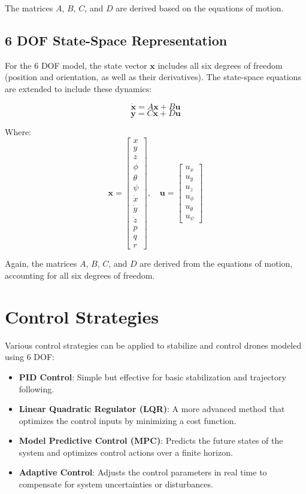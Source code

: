 \documentclass[a4paper,12pt]{report}
\begin{document}
The matrices \(A\), \(B\), \(C\), and \(D\) are derived based on the equations of motion.

\section{6 DOF State-Space Representation}
For the 6 DOF model, the state vector \(\mathbf{x}\) includes all six degrees of freedom (position and orientation, as well as their derivatives). The state-space equations are extended to include these dynamics:

\[
    \dot{\mathbf{x}} = A\mathbf{x} + B\mathbf{u}
\]
\[
    \mathbf{y} = C\mathbf{x} + D\mathbf{u}
\]

Where:
\[
    \mathbf{x} = \begin{bmatrix} x \\ y \\ z \\ \phi \\ \theta \\ \psi \\ \dot{x} \\ \dot{y} \\ \dot{z} \\ p \\ q \\ r \end{bmatrix}, \quad \mathbf{u} = \begin{bmatrix} u_x \\ u_y \\ u_z \\ u_\phi \\ u_\theta \\ u_\psi \end{bmatrix}
\]

Again, the matrices \(A\), \(B\), \(C\), and \(D\) are derived from the equations of motion, accounting for all six degrees of freedom.

\chapter{Control Strategies}

Various control strategies can be applied to stabilize and control drones modeled using 6 DOF:

\begin{itemize}
    \item \textbf{PID Control}: Simple but effective for basic stabilization and trajectory following.
    \item \textbf{Linear Quadratic Regulator (LQR)}: A more advanced method that optimizes the control inputs by minimizing a cost function.
    \item \textbf{Model Predictive Control (MPC)}: Predicts the future states of the system and optimizes control actions over a finite horizon.
    \item \textbf{Adaptive Control}: Adjusts the control parameters in real time to compensate for system uncertainties or disturbances.
\end{itemize}
\end{document}

